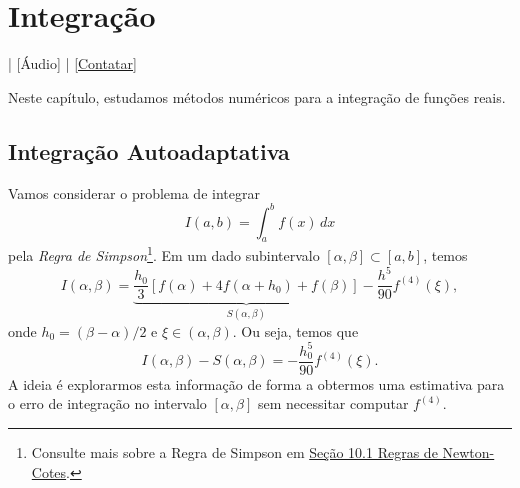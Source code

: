 
\chapter{Integração}\label{cap_integracao}
\thispagestyle{fancy}

\begin{flushright}
  [Vídeo] | [Áudio] | \href{https://phkonzen.github.io/notas/contato.html}{[Contatar]}
\end{flushright}

Neste capítulo, estudamos métodos numéricos para a integração de funções reais.

\section{Integração Autoadaptativa}\label{cap_integracao_sec_autoadapt}

Vamos considerar o problema de integrar
\begin{equation}
  I(a,b) = \int_a^b f(x)\,dx
\end{equation}
pela \emph{Regra de Simpson}\footnote{Consulte mais sobre a Regra de Simpson em \href{https://phkonzen.github.io/notas/MatematicaNumerica/cap_integr_sec_NC.html}{Seção 10.1 Regras de Newton-Cotes}.}. Em um dado subintervalo $[\alpha, \beta]\subset [a, b]$, temos
\begin{equation}
  I(\alpha, \beta) = \underbrace{\frac{h_0}{3}\left[f(\alpha) + 4f(\alpha+h_0) + f(\beta)\right]}_{S(\alpha,\beta)}-\frac{h^5}{90}f^{(4)}(\xi),
\end{equation}
onde $h_0=(\beta-\alpha)/2$ e $\xi\in (\alpha, \beta)$. Ou seja, temos que
\begin{equation}\label{eq:estS1}
  I(\alpha,\beta) - S(\alpha,\beta) = -\frac{h_0^5}{90}f^{(4)}(\xi).
\end{equation}
A ideia é explorarmos esta informação de forma a obtermos uma estimativa para o erro de integração no intervalo $[\alpha,\beta]$ sem necessitar computar $f^{(4)}$.

